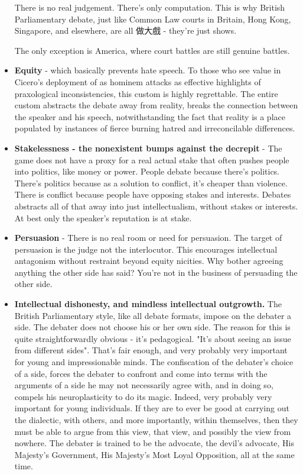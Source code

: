 \begin{itemize}
    There is no real judgement. There's only computation. 
    This is why British Parliamentary debate, just like Common Law courts in Britain, Hong Kong, Singapore, and elsewhere, are all 做大戲 - they're just shows. 

    The only exception is America, where court battles are still genuine battles. 


    \item \textbf{Equity} - which basically prevents hate speech. To those who see value in Cicero's deployment of as hominem attacks as effective highlights of praxological inconsistencies, this custom is highly regrettable. The entire custom abstracts the debate away from reality, breaks the connection between the speaker and his speech, notwithstanding the fact that reality is a place populated by instances of fierce burning hatred and irreconcilable differences.
    \item \textbf{Stakelessness - the nonexistent bumps against the decrepit} - The game does not have a proxy for a real actual stake that often pushes people into politics, like money or power. People debate because there's politics. There's politics because as a solution to conflict, it's cheaper than violence. There is conflict because people have opposing stakes and interests. Debates abstracts all of that away into just intellectualism, without stakes or interests. At best only the speaker's reputation is at stake.
    \item \textbf{Persuasion} - There is no real room or need for persuasion. The target of persuasion is the judge not the interlocutor. This encourages intellectual antagonism without restraint beyond equity nicities. Why bother agreeing anything the other side has said? You're not in the business of persuading the other side.
    \item \textbf{Intellectual dishonesty, and mindless intellectual outgrowth.} The British Parliamentary style, like all debate formats, impose on the debater a side. The debater does not choose his or her own side. The reason for this is quite straightforwardly obvious - it's pedagogical. "It's about seeing an issue from different sides". That's fair enough, and very probably very important for young and impressionable minds. The confiscation of the debater's choice of a side, forces the debater to confront and come into terms with the arguments of a side he may not necessarily agree with, and in doing so, compels his neuroplasticity to do its magic. Indeed, very probably very important for young individuals. If they are to ever be good at carrying out the dialectic, with others, and more importantly, within themselves, then they must be able to argue from this view, that view, and possibly the view from nowhere. The debater is trained to be the advocate, the devil's advocate, His Majesty's Government, His Majesty's Most Loyal Opposition, all at the same time.
    

\end{itemize}

